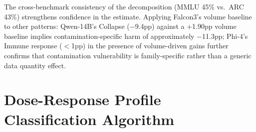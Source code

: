 \begin{table}[h]
\centering
\caption{Volume control decomposition (Falcon3-7B, seed$=$42). Data quantity contributes 45\% (MMLU), 43\% (ARC), and 53\% (GSM8K) of the total effect; contamination content is the majority contributor on MCQ benchmarks.$^{\dagger}$}
\label{tab:volume_control}
\footnotesize
{}
\end{table}

The cross-benchmark consistency of the decomposition (MMLU 45\% vs.\ ARC 43\%) strengthens confidence in the estimate. Applying Falcon3's volume baseline to other patterns: Qwen-14B's Collapse ($-$9.4pp) against a $+$1.90pp volume baseline implies contamination-specific harm of approximately $-$11.3pp; Phi-4's Immune response ($<$1pp) in the presence of volume-driven gains further confirms that contamination vulnerability is family-specific rather than a generic data quantity effect.

\section{Dose-Response Profile Classification Algorithm}
\label{sec:classification_algorithm}

